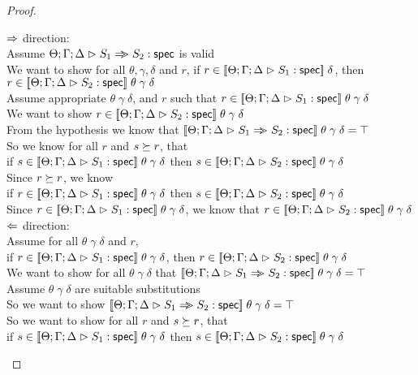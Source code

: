 \begin{proof}
  \begin{tabbedproof}
    \oo $\To$ direction:\\
    \ooo Assume $\judgeS{S_1 \specimp S_2}$ is valid\\
    \oooo We want to show for all $\theta, \gamma, \delta$ and $r$, if $r \in \interp{\judgeS{S_1}}\;\delta$, then\\
    \ooox $r \in \interp{\judgeS{S_2}}\;\theta\;\gamma\;\delta$ \\
    \oooo Assume appropriate $\theta\;\gamma\;\delta$, and $r$ such that $r \in \interp{\judgeS{S_1}}\;\theta\;\gamma\;\delta$ \\
    \ooooo We want to show $r \in \interp{\judgeS{S_2}}\;\theta\;\gamma\;\delta$ \\
    \oooooo From the hypothesis we know that $\interp{\judgeS{S_1 \specimp S_2}}\;\theta\;\gamma\;\delta = \top$ \\
    \oooooo So we know for all $r$ and $s \worldgeq r$, that \\
    \oooooox if $s \in \interp{\judgeS{S_1}}\;\theta\;\gamma\;\delta$ then $s \in \interp{\judgeS{S_2}}\;\theta\;\gamma\;\delta$ \\
    \oooooo Since $r \worldgeq r$, we know \\
    \oooooox if $r \in \interp{\judgeS{S_1}}\;\theta\;\gamma\;\delta$ then $s \in \interp{\judgeS{S_2}}\;\theta\;\gamma\;\delta$ \\
    \oooooo Since $r \in \interp{\judgeS{S_1}}\;\theta\;\gamma\;\delta$, we know that $r \in \interp{\judgeS{S_2}}\;\theta\;\gamma\;\delta$ \\
    \oo $\From$ direction:\\
    \ooo Assume for all $\theta\;\gamma\;\delta$ and $r$, \\
    \ooox if $r \in \interp{\judgeS{S_1}}\;\theta\;\gamma\;\delta$, then 
          $r \in \interp{\judgeS{S_2}}\;\theta\;\gamma\;\delta$ \\
    \ooo We want to show for all $\theta\;\gamma\;\delta$ that $\interp{\judgeS{S_1 \specimp S_2}}\;\theta\;\gamma\;\delta = \top$ \\
    \ooo Assume $\theta\;\gamma\;\delta$ are suitable substitutions \\
    \oooo So we want to show $\interp{\judgeS{S_1 \specimp S_2}}\;\theta\;\gamma\;\delta = \top$ \\
    \oooo So we want to show for all $r$ and $s \worldgeq r$, that \\
    \oooox if $s \in \interp{\judgeS{S_1}}\;\theta\;\gamma\;\delta$ then $s \in \interp{\judgeS{S_2}}\;\theta\;\gamma\;\delta$ \\

\end{tabbedproof}
\end{proof}

